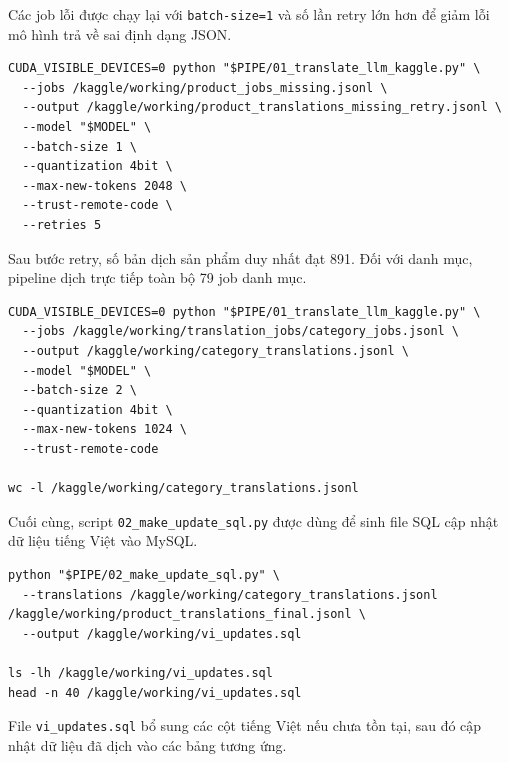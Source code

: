 Các job lỗi được chạy lại với \texttt{batch-size=1} và số lần retry lớn hơn để giảm lỗi mô hình trả về sai định dạng JSON.

\begin{lstlisting}[style=terminal,caption={Chạy lại các job sản phẩm bị lỗi với batch-size nhỏ hơn},label={lst:vi-retry-missing}]
CUDA_VISIBLE_DEVICES=0 python "$PIPE/01_translate_llm_kaggle.py" \
  --jobs /kaggle/working/product_jobs_missing.jsonl \
  --output /kaggle/working/product_translations_missing_retry.jsonl \
  --model "$MODEL" \
  --batch-size 1 \
  --quantization 4bit \
  --max-new-tokens 2048 \
  --trust-remote-code \
  --retries 5
\end{lstlisting}

Sau bước retry, số bản dịch sản phẩm duy nhất đạt 891. Đối với danh mục, pipeline dịch trực tiếp toàn bộ 79 job danh mục.

\begin{lstlisting}[style=terminal,caption={Dịch dữ liệu danh mục sản phẩm bằng Qwen3.5-9B},label={lst:vi-translate-categories}]
CUDA_VISIBLE_DEVICES=0 python "$PIPE/01_translate_llm_kaggle.py" \
  --jobs /kaggle/working/translation_jobs/category_jobs.jsonl \
  --output /kaggle/working/category_translations.jsonl \
  --model "$MODEL" \
  --batch-size 2 \
  --quantization 4bit \
  --max-new-tokens 1024 \
  --trust-remote-code

wc -l /kaggle/working/category_translations.jsonl
\end{lstlisting}

Cuối cùng, script \texttt{02\_make\_update\_sql.py} được dùng để sinh file SQL cập nhật dữ liệu tiếng Việt vào MySQL.

\begin{lstlisting}[style=terminal,caption={Sinh file SQL cập nhật dữ liệu tiếng Việt vào MySQL},label={lst:vi-make-update-sql}]
python "$PIPE/02_make_update_sql.py" \
  --translations /kaggle/working/category_translations.jsonl /kaggle/working/product_translations_final.jsonl \
  --output /kaggle/working/vi_updates.sql

ls -lh /kaggle/working/vi_updates.sql
head -n 40 /kaggle/working/vi_updates.sql
\end{lstlisting}

File \texttt{vi\_updates.sql} bổ sung các cột tiếng Việt nếu chưa tồn tại, sau đó cập nhật dữ liệu đã dịch vào các bảng tương ứng.

